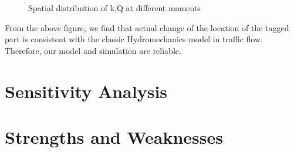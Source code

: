 \documentclass{mcmthesis}
\begin{document}
\begin{figure}[H]
\centering
{}
 \caption{Spatial distribution of k,Q at different moments} \label{fig:1}
\end{figure}
\indent From the above figure, we find that actual change of the location of the tagged part is consistent with the classic Hydromechanics model in traffic flow. \\
\indent Therefore, our model and simulation are reliable.
\indent \section{Sensitivity Analysis}

\section{Strengths and Weaknesses}
\end{document}

